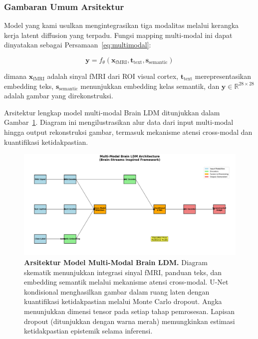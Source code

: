 \subsubsection{Gambaran Umum Arsitektur}
Model yang kami usulkan mengintegrasikan tiga modalitas melalui kerangka kerja latent diffusion yang terpadu. Fungsi mapping multi-modal ini dapat dinyatakan sebagai Persamaan~\ref{eq:multimodal}:

\begin{equation}
\mathbf{y} = f_{\theta}(\mathbf{x}_{\text{fMRI}}, \mathbf{t}_{\text{text}}, \mathbf{s}_{\text{semantic}})
\label{eq:multimodal}
\end{equation}

dimana $\mathbf{x}_{\text{fMRI}}$ adalah sinyal fMRI dari ROI visual cortex, $\mathbf{t}_{\text{text}}$ merepresentasikan embedding teks, $\mathbf{s}_{\text{semantic}}$ menunjukkan embedding kelas semantik, dan $\mathbf{y} \in \mathbb{R}^{28 \times 28}$ adalah gambar yang direkonstruksi.

Arsitektur lengkap model multi-modal Brain LDM ditunjukkan dalam Gambar~\ref{fig:architecture_methods}. Diagram ini mengilustrasikan alur data dari input multi-modal hingga output rekonstruksi gambar, termasuk mekanisme atensi cross-modal dan kuantifikasi ketidakpastian.

\begin{figure}[htbp]
\centering
\includegraphics[width=\textwidth]{../figures/Fig4_architecture.png}
\caption{\textbf{Arsitektur Model Multi-Modal Brain LDM.} Diagram skematik menunjukkan integrasi sinyal fMRI, panduan teks, dan embedding semantik melalui mekanisme atensi cross-modal. U-Net kondisional menghasilkan gambar dalam ruang laten dengan kuantifikasi ketidakpastian melalui Monte Carlo dropout. Angka menunjukkan dimensi tensor pada setiap tahap pemrosesan. Lapisan dropout (ditunjukkan dengan warna merah) memungkinkan estimasi ketidakpastian epistemik selama inferensi.}
\label{fig:architecture_methods}
\end{figure}

